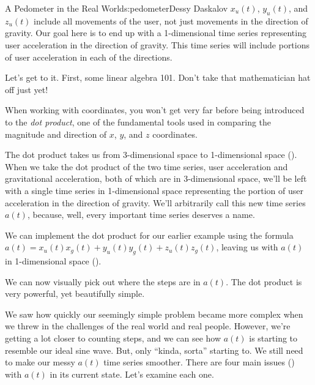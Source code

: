 \begin{aosachapter}{A Pedometer in the Real World}{s:pedometer}{Dessy Daskalov}
$x_{u}(t)$, $y_{u}(t)$, and $z_{u}(t)$ include all movements of the
user, not just movements in the direction of gravity. Our goal here is
to end up with a 1-dimensional time series representing user
acceleration in the direction of gravity. This time series will include
portions of user acceleration in each of the directions.

Let's get to it. First, some linear algebra 101. Don't take that
mathematician hat off just yet!

\label{the-dot-product}

When working with coordinates, you won't get very far before being
introduced to the \emph{dot product}, one of the fundamental tools used
in comparing the magnitude and direction of $x$, $y$, and $z$
coordinates.

The dot product takes us from 3-dimensional space to 1-dimensional space
(). When we take the dot product
of the two time series, user acceleration and gravitational
acceleration, both of which are in 3-dimensional space, we'll be left
with a single time series in 1-dimensional space representing the
portion of user acceleration in the direction of gravity. We'll
arbitrarily call this new time series $a(t)$, because, well, every
important time series deserves a name.


\label{implementing-the-dot-product}

We can implement the dot product for our earlier example using the
formula $a(t) = x_{u}(t)x_{g}(t) + y_{u}(t)y_{g}(t) + z_{u}(t)z_{g}(t)$,
leaving us with $a(t)$ in 1-dimensional space
().


We can now visually pick out where the steps are in $a(t)$. The dot
product is very powerful, yet beautifully simple.

\label{solutions-in-the-real-world}

We saw how quickly our seemingly simple problem became more complex when
we threw in the challenges of the real world and real people. However,
we're getting a lot closer to counting steps, and we can see how $a(t)$
is starting to resemble our ideal sine wave. But, only ``kinda, sorta''
starting to. We still need to make our messy $a(t)$ time series
smoother. There are four main issues
() with $a(t)$ in its current state.
Let's examine each one.


\end{aosachapter}

